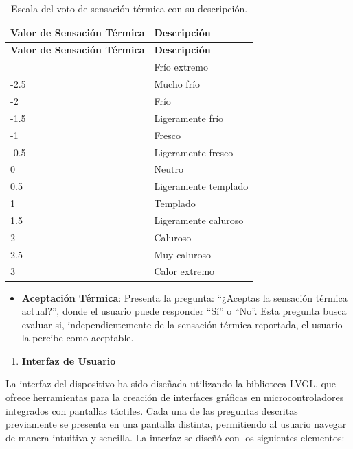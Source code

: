 \documentclass[
  12pt,
  letterpaper,
  DIV=11,
  numbers=noendperiod]{scrreport}
\providecommand{\tightlist}{%
  \setlength{\itemsep}{0pt}\setlength{\parskip}{0pt}}\usepackage{longtable,booktabs,array}
\begin{document}
\hypertarget{tbl-tsv}{}
\begin{longtable}[]{@{}ll@{}}
\caption{\label{tbl-tsv}Escala del voto de sensación térmica con su
descripción.}\tabularnewline
\toprule\noalign{}
\textbf{Valor de Sensación Térmica} & \textbf{Descripción} \\
\midrule\noalign{}
\endfirsthead
\toprule\noalign{}
\textbf{Valor de Sensación Térmica} & \textbf{Descripción} \\
\midrule\noalign{}
\endhead
\bottomrule\noalign{}
\endlastfoot
-3 & Frío extremo \\
-2.5 & Mucho frío \\
-2 & Frío \\
-1.5 & Ligeramente frío \\
-1 & Fresco \\
-0.5 & Ligeramente fresco \\
0 & Neutro \\
0.5 & Ligeramente templado \\
1 & Templado \\
1.5 & Ligeramente caluroso \\
2 & Caluroso \\
2.5 & Muy caluroso \\
3 & Calor extremo \\
\end{longtable}

\begin{itemize}
\tightlist
\item
  \textbf{Aceptación Térmica}: Presenta la pregunta: ``¿Aceptas la
  sensación térmica actual?'', donde el usuario puede responder ``Sí'' o
  ``No''. Esta pregunta busca evaluar si, independientemente de la
  sensación térmica reportada, el usuario la percibe como aceptable.
\end{itemize}

\begin{enumerate}
\def\labelenumi{\arabic{enumi}.}
\setcounter{enumi}{1}
\tightlist
\item
  \textbf{Interfaz de Usuario}
\end{enumerate}

La interfaz del dispositivo ha sido diseñada utilizando la biblioteca
LVGL, que ofrece herramientas para la creación de interfaces gráficas en
microcontroladores integrados con pantallas táctiles. Cada una de las
preguntas descritas previamente se presenta en una pantalla distinta,
permitiendo al usuario navegar de manera intuitiva y sencilla. La
interfaz se diseñó con los siguientes elementos:
\end{document}
